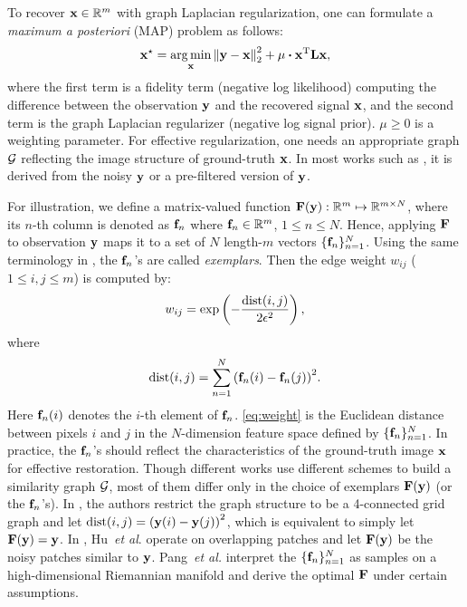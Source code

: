 \documentclass[10pt,twocolumn,letterpaper]{article}
\begin{document}
To recover ${\bf x}\in\mathbb{R}^m$ with graph Laplacian regularization, one can formulate a \textit{maximum a posteriori} (MAP) problem as follows:
\begin{equation}\label{eq:qp_glr}
{\bf x}^{\star} = \mathop {\arg \min }\limits_{\bf{x}} {{\left\| {  {\bf y} - {\bf x} } \right\|}_2^2} + \mu\bm\cdot{\bf x}^{\rm T}{\bf Lx},
\end{equation}
where the first term is a fidelity term (negative log likelihood) computing the difference between the observation ${\bf y}$ and the recovered signal ${\bf x}$, and the second term is the graph Laplacian regularizer (negative log signal prior). 
$\mu\ge 0$ is a weighting parameter. 
For effective regularization, one needs an appropriate graph $\cal G$ reflecting the image structure of ground-truth ${\bf x}$. 
In most works such as \cite{pang2017graph,hu2016graph,osher2017low}, it is derived from the noisy $\bf{y}$ or a pre-filtered version of $\bf{y}$. 

For illustration, we define a matrix-valued function ${\bf F}({\bf y}): \mathbb{R}^m\mapsto\mathbb{R}^{m\times N}$, where its $n$-th column is denoted as ${\bf f}_n$ where ${\bf f}_n\in\mathbb{R}^m$, $1\le n\le N$. 
Hence, applying ${\bf F}$ to observation ${\bf y}$ maps it to a set of $N$ length-$m$ vectors $\{{\bf f}_n\}_{n=1}^{N}$. 
Using the same terminology in \cite{pang2017graph}, the ${{\bf f}_n}$'s are called \emph{exemplars}.
Then the edge weight $w_{ij}$ ($1\le i, j \le m$) is computed by:
\begin{equation}\label{eq:weight_ori}
w_{ij} = \exp\left(-\frac{{\rm dist}(i,j)}{2\epsilon^2}\right),
\end{equation}
where
\begin{equation}\label{eq:weight}
{\rm dist}(i,j) = \sum_{n = 1}^N{\left ( {\bf f}_n(i) - {\bf f}_n(j) \right )^2}.
\end{equation}
Here ${\bf f}_n(i)$ denotes the $i$-th element of ${\bf f}_n$. 
\eqref{eq:weight} is the Euclidean distance between pixels $i$ and $j$ in the $N$-dimension feature space defined by $\{{\bf f}_n\}_{n=1}^{N}$. 
In practice, the ${{\bf f}_n}$'s should reflect the characteristics of the ground-truth image ${\bf x}$ for effective restoration. 
Though different works use different schemes to build a similarity graph $\cal G$, most of them differ only in the choice of exemplars ${\bf F}({\bf y})$ (or the ${\bf f}_n$'s). 
In \cite{liu2014progressive,kheradmand2014general}, the authors restrict the graph structure to be a 4-connected grid graph and let ${\rm dist}(i,j)= \left ( {\bf y}(i) - {\bf y}(j) \right )^2$, which is equivalent to simply let ${\bf F}({\bf y})={\bf y}$. 
In \cite{hu2016graph}, Hu~{\it et al}. operate on overlapping patches and let ${\bf F}({\bf y})$ be the noisy patches similar to ${\bf y}$. 
Pang~{\it et al.} \cite{pang2017graph} interpret the $\{{\bf f}_n\}_{n=1}^{N}$ as samples on a high-dimensional Riemannian manifold and derive the optimal ${\bf F}$ under certain assumptions. 
\end{document}
